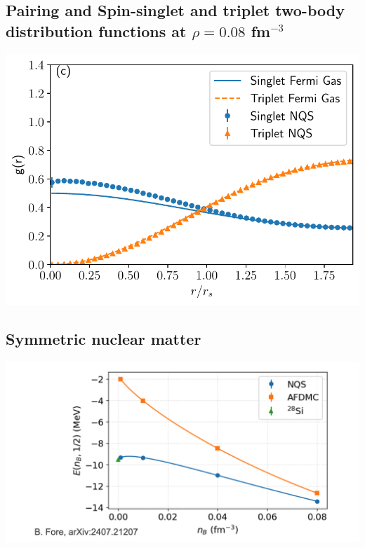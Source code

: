 \documentclass[%
oneside,                 %
final,                   %
10pt]{article}
\begin{document}
\subsection{Pairing and Spin-singlet and triplet two-body distribution functions at $\rho=0.08$ fm$^{-3}$}
\begin{block}{}

\vspace{6mm}

\centerline{\includegraphics[width=0.9\linewidth]{figures/08_tbd.pdf}}

\vspace{6mm}

\end{block}

\subsection{Symmetric nuclear matter}

\vspace{6mm}

\centerline{\includegraphics[width=1.0\linewidth]{figures/mbpfig6.png}}
\end{document}

